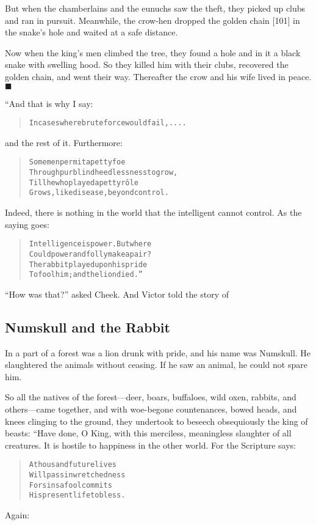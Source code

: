 \documentclass[article, twoside, 14pt]{memoir}
\newcommand{\qed}{\hfill \ensuremath{\blacksquare}}
\renewenvironment{verbatim}{%
\begin{quote}%
\vskip -10pt%
\begin{alltt}\normalfont\large}{\end{alltt}%
\end{quote}%
\vskip -10pt
} %
\begin{document}
But when the chamberlains and the eunuchs saw the theft, they
picked up clubs and ran in pursuit. Meanwhile, the crow-hen dropped
the golden chain [101] in the snake's hole and waited at a safe
distance.

Now when the king's men climbed the tree, they found a hole and in
it a black snake with swelling hood. So they killed him with their
clubs, recovered the golden chain, and went their way. Thereafter
the crow and his wife lived in peace.\hyperref[s8]{\qed}

“And that is why I say:

\begin{verbatim}
In cases where brute force would fail, ....
\end{verbatim}
and the rest of it. Furthermore:

\begin{verbatim}
Some men permit a petty foe
Through purblind heedlessness to grow,
Till he who played a petty rôle
Grows, like disease, beyond control.
\end{verbatim}
Indeed, there is nothing in the world that the intelligent cannot
control. As the saying goes:

\begin{verbatim}
Intelligence is power. But where
Could power and folly make a pair?
The rabbit played upon his pride
To fool him; and the lion died.”
\end{verbatim}
``How was that?'' asked Cheek. And Victor told the story of

\subsection{Numskull and the Rabbit}

\label{s10}

In a part of a forest was a lion drunk with pride, and his name was
Numskull. He slaughtered the animals without ceasing. If he saw an
animal, he could not spare him.

So all the natives of the forest---deer, boars, buffaloes, wild
oxen, rabbits, and others---came together, and with woe-begone
countenances, bowed heads, and knees clinging to the ground, they
undertook to beseech obsequiously the king of beasts: “Have done, O
King, with this merciless, meaningless slaughter of all creatures.
It is hostile to happiness in the other world. For the Scripture
says:

\begin{verbatim}
A thousand future lives
    Will pass in wretchedness
For sins a fool commits
    His present life to bless.
\end{verbatim}
Again:
\end{document}
